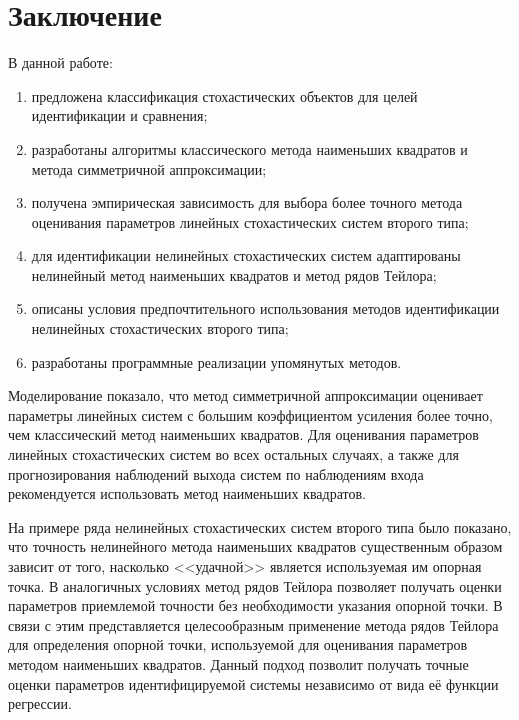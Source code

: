 \section{Заключение}

В данной работе:
\begin{enumerate}
\item предложена классификация стохастических объектов для целей
  идентификации и сравнения;
\item разработаны алгоритмы классического метода наименьших квадратов и
  метода симметричной аппроксимации;
\item получена эмпирическая зависимость для выбора более точного метода
  оценивания параметров линейных стохастических систем второго типа;
\item для идентификации нелинейных стохастических
  систем адаптированы нелинейный метод наименьших квадратов и метод рядов Тейлора;
\item описаны условия предпочтительного использования
  методов идентификации нелинейных стохастических второго типа;
\item разработаны программные реализации упомянутых методов.
\end{enumerate}

Моделирование показало, что метод симметричной аппроксимации оценивает
параметры линейных систем с большим коэффициентом усиления более точно,
чем классический метод наименьших квадратов.
Для оценивания параметров линейных стохастических систем во всех остальных случаях,
а также для прогнозирования наблюдений выхода систем по наблюдениям входа
рекомендуется использовать метод наименьших квадратов.

На примере ряда нелинейных стохастических систем второго типа было показано,
что точность нелинейного метода наименьших квадратов существенным образом
зависит от того, насколько <<удачной>> является используемая им опорная точка.
В аналогичных условиях метод рядов Тейлора позволяет получать оценки параметров
приемлемой точности без необходимости указания опорной точки.
В связи с этим представляется целесообразным применение метода рядов Тейлора
для определения опорной точки, используемой для оценивания параметров методом
наименьших квадратов.
Данный подход позволит получать точные оценки параметров идентифицируемой системы
независимо от вида её функции регрессии.
